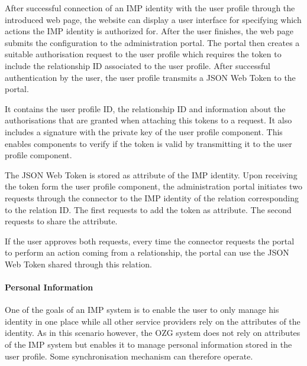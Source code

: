\documentclass[
     12pt,         %
     a4paper,      %
     BCOR=10mm,version=first,     %
     DIV=14,version=first,        %
     ]{scrreprt}
\begin{document}
After successful connection of an IMP identity with the user profile through the introduced web page, the website can display a user interface for specifying which actions the IMP identity is authorized for. After the user finishes, the web page submits the configuration to the administration portal. The portal then creates a suitable authorisation request to the user profile which requires the token to include the relationship ID associated to the user profile. After successful authentication by the user, the user profile transmits a JSON Web Token to the portal. 

It contains the user profile ID, the relationship ID and information about the authorisations that are granted when attaching this tokens to a request. It also includes a signature with the private key of the user profile component. This enables components to verify if the token is valid by transmitting it to the user profile component.

The JSON Web Token is stored as attribute of the IMP identity. Upon receiving the token form the user profile component, the administration portal initiates two requests through the connector to the IMP identity of the relation corresponding to the relation ID. The first requests to add the token as attribute. The second requests to share the attribute.

If the user approves both requests, every time the connector requests the portal to perform an action coming from a relationship, the portal can use the JSON Web Token shared through this relation.

\paragraph{Personal Information}

One of the goals of an IMP system is to enable the user to only manage his identity in one place while all other service providers rely on the attributes of the identity. As in this scenario however, the OZG system does not rely on attributes of the IMP system but enables it to manage personal information stored in the user profile. Some synchronisation mechanism can therefore operate.
\end{document}
